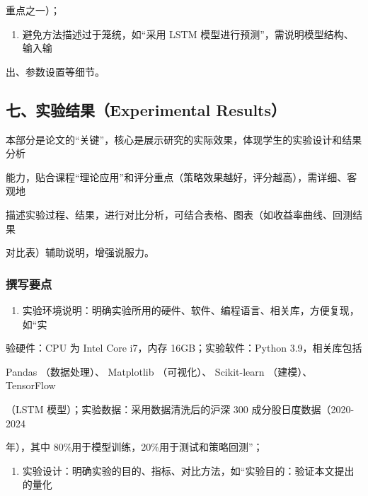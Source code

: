 \documentclass[
]{article}
\providecommand{\tightlist}{%
  \setlength{\itemsep}{0pt}\setlength{\parskip}{0pt}}
\begin{document}
重点之一）；

\begin{enumerate}
\def\labelenumi{\arabic{enumi}.}
\setcounter{enumi}{3}
\tightlist
\item
  避免方法描述过于笼统，如``采用 LSTM
  模型进行预测''，需说明模型结构、输入输
\end{enumerate}

出、参数设置等细节。

\hypertarget{ux4e03ux5b9eux9a8cux7ed3ux679cexperimental-results}{%
\subsection{\texorpdfstring{\textbf{七、实验结果（Experimental
Results）}}{七、实验结果（Experimental Results）}}\label{ux4e03ux5b9eux9a8cux7ed3ux679cexperimental-results}}

本部分是论文的``关键''，核心是展示研究的实际效果，体现学生的实验设计和结果分析

能力，贴合课程``理论应用''和评分重点（策略效果越好，评分越高），需详细、客观地

描述实验过程、结果，进行对比分析，可结合表格、图表（如收益率曲线、回测结果

对比表）辅助说明，增强说服力。

\hypertarget{ux64b0ux5199ux8981ux70b9-2}{%
\subsubsection{\texorpdfstring{\textbf{撰写要点}}{撰写要点}}\label{ux64b0ux5199ux8981ux70b9-2}}

\begin{enumerate}
\def\labelenumi{\arabic{enumi}.}
\tightlist
\item
  实验环境说明：明确实验所用的硬件、软件、编程语言、相关库，方便复现，如``实
\end{enumerate}

验硬件：CPU 为 Intel Core i7，内存 16GB；实验软件：Python
3.9，相关库包括

Pandas （数据处理）、 Matplotlib （可视化）、 Scikit-learn （建模）、
TensorFlow

（LSTM 模型）；实验数据：采用数据清洗后的沪深 300
成分股日度数据（2020-2024

年），其中 80\%用于模型训练，20\%用于测试和策略回测''；

\begin{enumerate}
\def\labelenumi{\arabic{enumi}.}
\setcounter{enumi}{1}
\tightlist
\item
  实验设计：明确实验的目的、指标、对比方法，如``实验目的：验证本文提出的量化
\end{enumerate}
\end{document}
